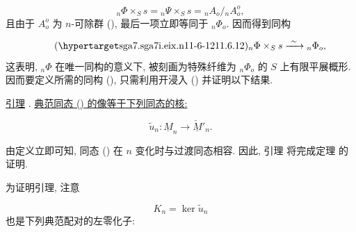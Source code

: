 \begin{equation*}
{}_n\Phi\times_Ss={}_n\Psi\times_Ss={}_nA_o/{}_nA_o^o,
\end{equation*}
且由于 $A_o^o$ 为 $n$-可除群 (), 最后一项立即等同于 ${}_n\Phi_o$. 因而得到同构

\begin{equation}\tag{\SGARefTarget{sga7.sga7i.eix.n11-6-12}{11.6.12}}
{}_n\Phi\times_Ss\xrightarrow{\ \sim\ }{}_n\Phi_o,
\end{equation}
这表明, ${}_n\Phi$ 在唯一同构的意义下, 被刻画为特殊纤维为 ${}_n\Phi_o$ 的 $S$ 上有限平展概形. 因而要定义所需的同构 (), 只需利用开浸入 () 并证明以下结果.

\medskip
\noindent
\underline{引理} . \underline{典范同态 () 的像等于下列同态的核:}

\begin{equation*}
\widetilde u_n:\underline M_n\longrightarrow\underline{\check M}'_n.
\end{equation*}

由定义立即可知, 同态 () 在 $n$ 变化时与过渡同态相容. 因此, 引理  将完成定理  的证明.



为证明引理, 注意

\begin{equation*}
K_n=\ker\widetilde u_n
\end{equation*}
也是下列典范配对的左零化子:

